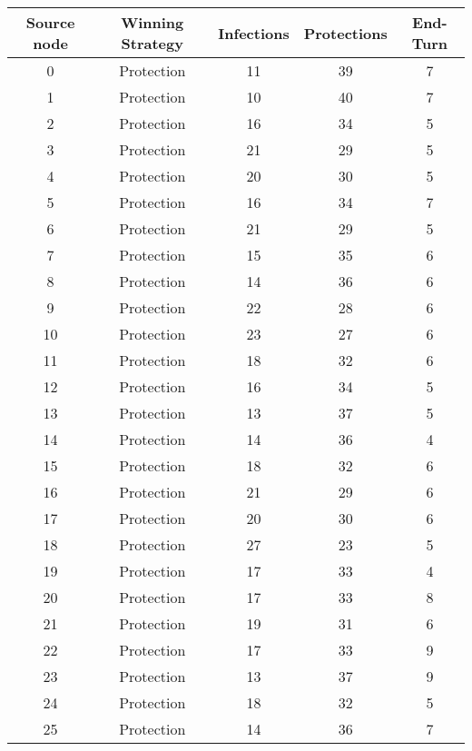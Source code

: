 \documentclass[results.tex]{subfiles}
\begin{document}
\begin{center}
  \begin{tabular}{| c || c | c | c | c |}
    \hline
    {\bfseries Source node} & {\bfseries Winning Strategy} & {\bfseries Infections} & {\bfseries Protections} & {\bfseries End-Turn} \\  %
    \hline\hline
    0 & Protection & 11 & 39 & 7 \\ 
    \hline
    1 & Protection & 10 & 40 & 7 \\ 
    \hline
    2 & Protection & 16 & 34 & 5 \\ 
    \hline
    3 & Protection & 21 & 29 & 5 \\ 
    \hline
    4 & Protection & 20 & 30 & 5 \\ 
    \hline
    5 & Protection & 16 & 34 & 7 \\ 
    \hline
    6 & Protection & 21 & 29 & 5 \\ 
    \hline
    7 & Protection & 15 & 35 & 6 \\ 
    \hline
    8 & Protection & 14 & 36 & 6 \\ 
    \hline
    9 & Protection & 22 & 28 & 6 \\ 
    \hline
    10 & Protection & 23 & 27 & 6 \\ 
    \hline
    11 & Protection & 18 & 32 & 6 \\ 
    \hline
    12 & Protection & 16 & 34 & 5 \\ 
    \hline
    13 & Protection & 13 & 37 & 5 \\ 
    \hline
    14 & Protection & 14 & 36 & 4 \\ 
    \hline
    15 & Protection & 18 & 32 & 6 \\ 
    \hline
    16 & Protection & 21 & 29 & 6 \\ 
    \hline
    17 & Protection & 20 & 30 & 6 \\ 
    \hline
    18 & Protection & 27 & 23 & 5 \\ 
    \hline
    19 & Protection & 17 & 33 & 4 \\ 
    \hline
    20 & Protection & 17 & 33 & 8 \\ 
    \hline
    21 & Protection & 19 & 31 & 6 \\ 
    \hline
    22 & Protection & 17 & 33 & 9 \\ 
    \hline
    23 & Protection & 13 & 37 & 9 \\ 
    \hline
    24 & Protection & 18 & 32 & 5 \\ 
    \hline
    25 & Protection & 14 & 36 & 7 \\ 

\end{tabular}
\end{center}
\end{document}
